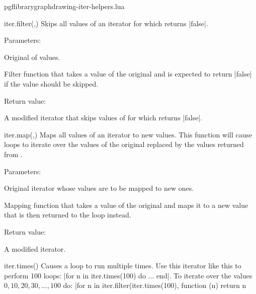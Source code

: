 
\begin{filedescription}{pgflibrarygraphdrawing-iter-helpers.lua}


\begin{luacommand}{{iter.filter}(,)}
Skips all values of an iterator for which  returns |false|. 

Parameters:
\begin{parameterdescription}
	\item[\meta{iterator}] Original  of values.\item[\meta{filter\_func}] Filter function that takes a value of the original  and is expected to return |false| if the value should be skipped. 
\end{parameterdescription}


Return value:
\begin{parameterdescription} 
  \item[] A modified iterator that skips values of  for which  returns |false|. 
\end{parameterdescription}


\end{luacommand}
\begin{luacommand}{{iter.map}(,)}
Maps all values of an iterator to new values.  This function will cause loops to iterate over the values of the original  replaced by the values returned from . 

Parameters:
\begin{parameterdescription}
	\item[\meta{iterator}] Original iterator whose values are to be mapped to new ones.\item[\meta{map\_func}] Mapping function that takes a value of the original  and maps it to a new value that is then returned to the loop instead. 
\end{parameterdescription}


Return value:
\begin{parameterdescription} 
  \item[] A modified iterator. 
\end{parameterdescription}


\end{luacommand}
\begin{luacommand}{{iter.times}()}
Causes a loop to run multiple times.  Use this iterator like this to perform 100 loops: |for n in iter.times(100) do ... end|.  To iterate over the values $0, 10, 20, 30, ..., 100$ do: |for n in iter.filter(iter.times(100), function (n) return n %


\end{luacommand}
\end{filedescription}
